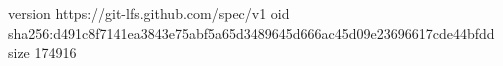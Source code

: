 version https://git-lfs.github.com/spec/v1
oid sha256:d491c8f7141ea3843e75abf5a65d3489645d666ac45d09e23696617cde44bfdd
size 174916
